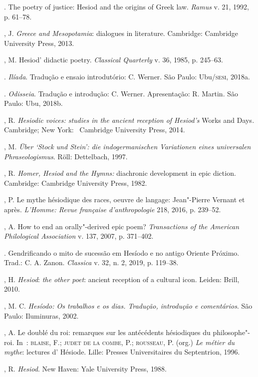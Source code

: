 \begin{bibliohedra}
\titidem. The poetry of justice: Hesiod and the origins of Greek law.
\emph{Ramus} v. 21, 1992, p. 61--78.

, J. \emph{Greece and Mesopotamia}: dialogues in literature.
Cambridge: Cambridge University Press, 2013.

, M. Hesiod' didactic poetry. \emph{Classical Quarterly} v. 36,
1985, p. 245--63.

. \emph{Ilíada}. Tradução e ensaio introdutório: C. Werner. São
Paulo: Ubu/\textsc{sesi}, 2018a.

\titidem. \emph{Odisseia}. Tradução e introdução: C. Werner. Apresentação: R.
Martin. São Paulo: Ubu, 2018b.

, R. \emph{Hesiodic voices: studies in the ancient reception of
Hesiod's} Works and Days\emph{.} Cambridge; New York: ~Cambridge
University Press, 2014.

, M. \emph{Über `Stock und Stein': die indogermanischen Variationen
eines universalen Phraseologismus}. Röll: Dettelbach, 1997.

, R. \emph{Homer, Hesiod and the Hymns:} diachronic development in
epic diction. Cambridge: Cambridge University Press, 1982.

, P. Le mythe hésiodique des races, oeuvre de langage:
Jean"-Pierre Vernant et après. \emph{L'Homme: Revue française
d'anthropologie} 218, 2016, p. 239--52.

, A. How to end an orally"-derived epic poem? \emph{Transactions of
the American Philological Association} v. 137, 2007, p. 371--402.

\titidem. Gendrificando o mito de sucessão em Hesíodo e no antigo Oriente
Próximo. Trad.: C. A. Zanon. \emph{Classica} v. 32, n. 2, 2019, p.
119--38.

, H. \emph{Hesiod}: \emph{the other poet}: ancient reception of a
cultural icon. Leiden: Brill, 2010.

, M. C. \emph{Hesíodo: Os trabalhos e os dias. Tradução, introdução
e comentários}. São Paulo: Iluminuras, 2002.

, A. Le doublé du roi: remarques sur les antécédents hésiodiques du
philosophe"-roi. In~: \textsc{blaise}, F.; \textsc{judet de la combe}, P.; \textsc{rousseau}, P.
(org.) \emph{Le métier du mythe}: lectures d' Hésiode. Lille: Presses
Universitaires du Septentrion, 1996.

, R. \emph{Hesiod}. New Haven: Yale University Press, 1988.


\end{bibliohedra}
